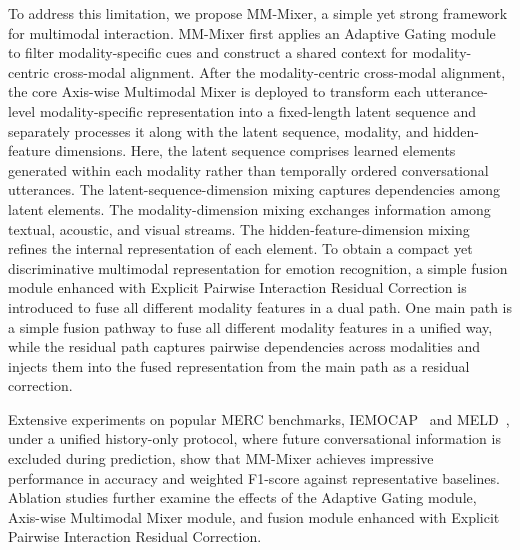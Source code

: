 \documentclass[letterpaper]{article} %
\begin{document}
To address this limitation, we propose MM-Mixer, a simple yet strong framework for multimodal interaction. MM-Mixer first applies an Adaptive Gating module to filter modality-specific cues and construct a shared context for modality-centric cross-modal alignment. After the modality-centric cross-modal alignment, the core Axis-wise Multimodal Mixer is deployed to transform each utterance-level modality-specific representation into a fixed-length latent sequence and separately processes it along with the latent sequence, modality, and hidden-feature dimensions.
Here, the latent sequence comprises learned elements generated within each modality rather than temporally ordered conversational utterances. The latent-sequence-dimension mixing captures dependencies among latent elements. The modality-dimension mixing exchanges information among textual, acoustic, and visual streams. The hidden-feature-dimension mixing refines the internal
representation of each element. To obtain a compact yet discriminative multimodal representation for emotion recognition, a simple fusion module enhanced with Explicit Pairwise Interaction Residual Correction is introduced to fuse all different modality
features in a dual path. One main path is a simple fusion pathway to fuse all different modality
features in a unified way, while the residual path captures pairwise dependencies across modalities and injects them into the fused representation from the main path as a residual correction.

Extensive experiments on popular MERC benchmarks, IEMOCAP~\cite{iemocap} and MELD~\cite{meld}, under a unified history-only protocol, where future conversational information is excluded during prediction, show that MM-Mixer achieves impressive performance in accuracy and weighted F1-score against representative baselines. Ablation studies further examine the effects of the Adaptive Gating module, Axis-wise Multimodal Mixer module, and fusion module enhanced with Explicit Pairwise Interaction Residual Correction.

\end{document}
